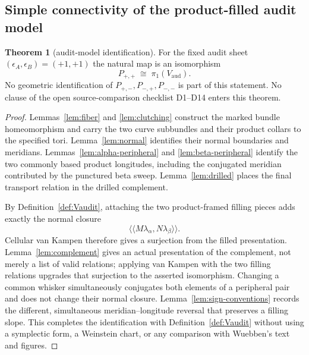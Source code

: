 \documentclass[11pt]{article}
\newcommand{\pione}{\pi_1}
\theoremstyle{definition}
\newtheorem{theorem}{Theorem}[section]
\begin{document}
\subsection{Simple connectivity of the product-filled audit model}

\begin{theorem}[audit-model identification]\label{prop:ident}
For the fixed audit sheet $(\epsilon_A,\epsilon_B)=(+1,+1)$ the natural map
is an isomorphism
\[
 P_{+,+}\;\cong\;\pione(V_{\mathrm{aud}}).
\]
No geometric identification of $P_{+,-},
P_{-,+},P_{-,-}$ is part of this statement.  No clause of the open
source-comparison checklist D1--D14 enters this theorem.
\end{theorem}

\begin{proof}
Lemmas~\ref{lem:fiber} and \ref{lem:clutching} construct the marked bundle
homeomorphism and carry the two curve subbundles and their product collars to
the specified tori.  Lemma~\ref{lem:normal} identifies their normal
boundaries and meridians.  Lemmas~\ref{lem:alpha-peripheral} and
\ref{lem:beta-peripheral} identify the two commonly based product
longitudes, including the conjugated meridian contributed by the punctured
beta sweep.  Lemma~\ref{lem:drilled} places the final transport relation in
the drilled complement.

By Definition~\ref{def:Vaudit}, attaching the two product-framed filling
pieces adds exactly the normal closure
\[
 \big\langle\!\big\langle
 M\lambda_\alpha,
 N\lambda_\beta
 \big\rangle\!\big\rangle.
\]
Cellular van Kampen therefore gives a surjection from the filled
presentation.  Lemma~\ref{lem:complement} gives an actual presentation of
the complement, not merely a list of valid relations; applying van Kampen
with the two filling relations upgrades that surjection to the asserted
isomorphism.
Changing a common whisker simultaneously conjugates both elements of a
peripheral pair and does not change their normal closure.
Lemma~\ref{lem:sign-conventions} records the different, simultaneous
meridian--longitude reversal that preserves a filling slope.  This completes
the identification with Definition~\ref{def:Vaudit} without using a
symplectic form, a Weinstein chart, or any comparison with Wuebben's text and
figures.
\end{proof}
\end{document}
